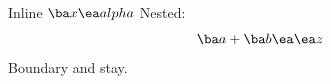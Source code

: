 \documentclass{article}
\begin{document}
Inline $ \ba x\ea alpha $
Nested:
\[\ba a + \ba b\ea\ea z\]
Boundary \baalpha and \eaalpha stay.
\end{document}
